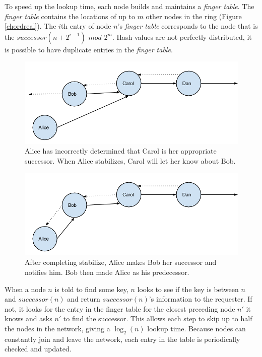 \documentclass[conference, compsocconf, letterpaper]{IEEEtran}
\begin{document}
To speed up the lookup time, each node builds and maintains a \emph{finger table}.  The \emph{finger table} contains the locations of up to $m$ other nodes in the ring (Figure \ref{chordreal}).  The $i$th entry of node $n$'s \emph{finger table} corresponds to the node that is the $successor(n+2^{i-1})$ $mod$ $2^m$. Hash values are not perfectly distributed, it is possible to have duplicate entries in the \emph{finger table}. 


\begin{figure}
    \includegraphics[width=\linewidth]{abcd1}
    \caption{Alice has incorrectly determined that Carol is her appropriate successor.  When Alice stabilizes, Carol will let her know about Bob.}
    \label{abcd1}
\end{figure}


\begin{figure}
    \includegraphics[width=\linewidth]{abcd2}
    \caption{After completing stabilize, Alice makes Bob her successor and notifies him. Bob then made Alice as his predecessor.}
    \label{abcd2}
\end{figure}



When a node $n$ is told to find some key, $n$ looks to see if the key is between $n$ and $successor(n)$ and return $successor(n)$'s information to the requester. If not, it looks for the entry in the finger table for the closest preceding node $n'$ it knows and asks $n'$ to find the successor.  This allows each step to skip up to half the nodes in the network, giving a $\log_2(n)$ lookup time.  Because nodes can constantly join and leave the network, each entry in the table is periodically checked and updated. 
\end{document}
